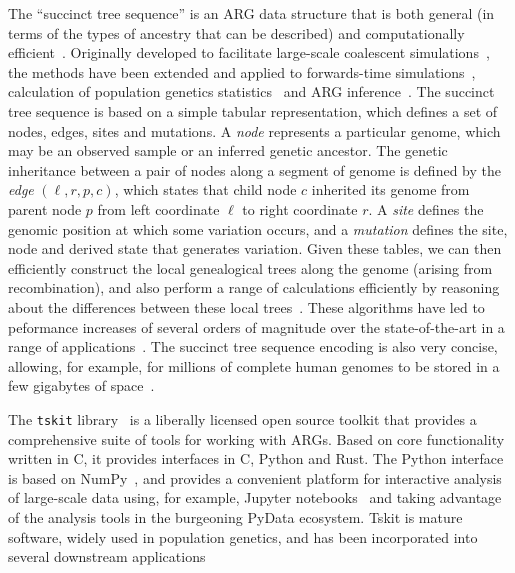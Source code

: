 \documentclass{article}
\begin{document}
The ``succinct tree sequence'' is an ARG data structure
that is both general (in terms of the types of ancestry that can
be described) and computationally efficient~\citep{Wong2023-efficient}.
Originally developed to facilitate large-scale coalescent
simulations~\citep{Kelleher2016-wk}, the methods have been
extended and applied to forwards-time
simulations~\citep{Kelleher2018-xc,Haller2018-tree},
calculation of population genetics statistics~\citep{Ralph2020-efficiently}
and ARG inference~\citep{Kelleher2019-ba,Wohns2022-th}.
The succinct tree sequence is based on a simple tabular representation,
which defines a set of nodes, edges, sites and mutations. A \emph{node}
represents a particular genome, which may be an observed sample
or an inferred genetic ancestor. The genetic inheritance between
a pair of nodes along a segment of genome is defined by
the \emph{edge} $(\ell, r, p, c)$, which states that
child node $c$ inherited its genome from parent node $p$
from left coordinate $\ell$ to right coordinate $r$. A \emph{site}
defines the genomic position at which some variation occurs,
and a \emph{mutation} defines the site, node and derived state
that generates variation.
Given these tables, we can then efficiently construct the local
genealogical trees along the genome (arising from recombination),
and also perform a range of calculations efficiently by
reasoning about the differences between these local
trees~\citep{Kelleher2016-wk,Ralph2020-efficiently}. These
algorithms have led to peformance increases of several orders
of magnitude over the state-of-the-art in a range of
applications~\citep{Kelleher2016-wk,Kelleher2018-xc,Kelleher2019-ba,
Ralph2020-efficiently,Baumdicker2022-ep}.
The succinct tree sequence encoding
is also very concise, allowing, for example, for millions of
complete human genomes to be stored in a few gigabytes of
space~\citep{Kelleher2019-ba}.

The \texttt{tskit} library~\citep{Tskit2023-tskit} is a liberally
licensed open source toolkit that provides a comprehensive suite
of tools for working with ARGs. Based on core functionality written
in C, it provides interfaces in C, Python and Rust. The Python interface
is based on NumPy~\citep{Harris2020-array}, and provides a convenient
platform for interactive analysis of large-scale data using, for
example, Jupyter notebooks~\citep{Kluyver2016-jupyter} and taking
advantage of the analysis tools in the burgeoning PyData ecosystem.
Tskit is mature software, widely used in population genetics, and
has been incorporated into several downstream
applications~\citep[e.g.][]{Speidel2019-yh,Haller2019-slim}
\end{document}
